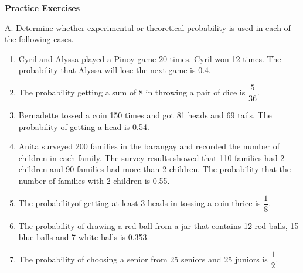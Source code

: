 \textbf{Practice Exercises}

\vspce
A. Determine whether experimental or theoretical probability is used in each of the following cases. 
%
{\begin{enumerate}[label = \arabic*. ]
\item Cyril and Alyssa played a Pinoy game 20 times. Cyril won 12 times. The probability that Alyssa will lose the next game is 0.4.
\item The probability getting a sum of 8 in throwing a pair of dice is $\dfrac{5}{36}$. 
\item Bernadette tossed a coin 150 times and got 81 heads and 69 tails. The probability of getting a head is 0.54.
\item Anita surveyed 200 families in the barangay and recorded the number of children in each family. The survey results showed that 110 families had 2 children and 90 families had more than 2 children. The probability that the number of families with 2 children is 0.55.
\item The probabilityof getting at least 3 heads in tossing a coin thrice is $\dfrac{1}{8}$. 
\item The probability of drawing a red ball from a jar that contains 12 red balls, 15 blue balls and 7 white balls is 0.353.
\item The probability of choosing a senior from 25 seniors and 25 juniors is $\dfrac{1}{2} $. 

\end{enumerate}}

